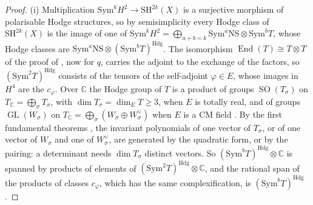 \documentclass[11pt,reqno]{amsart}
\theoremstyle{plain}
\theoremstyle{definition}
\theoremstyle{remark}
\newcommand{\CC}{\mathbb{C}}
\newcommand{\Hdg}{\mathrm{Hdg}}
\newcommand{\NS}{\mathrm{NS}}
\DeclareMathOperator{\End}{End}
\DeclareMathOperator{\GL}{GL}
\DeclareMathOperator{\SO}{SO}
\begin{document}
\begin{proof}
(i) Multiplication $\mathrm{Sym}^{k}H^{2}\to\mathrm{SH}^{2k}(X)$ is a
surjective morphism of polarisable Hodge structures, so by semisimplicity
every Hodge class of $\mathrm{SH}^{2k}(X)$ is the image of one of
$\mathrm{Sym}^{k}H^{2}=\bigoplus_{a+b=k}\mathrm{Sym}^{a}\NS\otimes
\mathrm{Sym}^{b}T$, whose Hodge classes are
$\mathrm{Sym}^{a}\NS\otimes(\mathrm{Sym}^{b}T)^{\Hdg}$. The isomorphism
$\End(T)\cong T\otimes T$ of the proof of , now for $q$,
carries the adjoint to the exchange of the factors, so
$(\mathrm{Sym}^{2}T)^{\Hdg}$ consists of the tensors of the self-adjoint
$\varphi\in E$, whose images in $H^{4}$ are the $c_{\varphi}$. Over $\CC$ the
Hodge group of $T$ is a product of groups $\SO(T_{\sigma})$ on
$T_{\CC}=\bigoplus_{\sigma}T_{\sigma}$, with $\dim T_{\sigma}=\dim_{E}T\ge3$,
when $E$ is totally real, and of groups $\GL(W_{\sigma})$ on
$T_{\CC}=\bigoplus_{\sigma}(W_{\sigma}\oplus W_{\sigma}^{\vee})$ when $E$ is a
CM field \cite{Zar83}. By the first fundamental theorems
\cite[Chapter~5]{GW09}, the invariant polynomials of one vector of
$T_{\sigma}$, or of one vector of $W_{\sigma}$ and one of $W_{\sigma}^{\vee}$,
are generated by the quadratic form, or by the pairing: a determinant needs
$\dim T_{\sigma}$ distinct vectors. So $(\mathrm{Sym}^{b}T)^{\Hdg}\otimes\CC$
is spanned by products of elements of $(\mathrm{Sym}^{2}T)^{\Hdg}\otimes\CC$,
and the rational span of the products of classes $c_{\varphi}$, which has the
same complexification, is $(\mathrm{Sym}^{b}T)^{\Hdg}$.


\end{proof}
\end{document}
